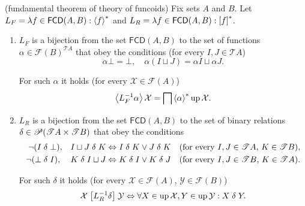 \begin{thm}
\label{fcd-as-cont}(fundamental theorem of theory of funcoids) Fix sets $A$ and $B$. Let $L_{F}=\lambda f\in\mathsf{FCD}(A,B):\left\langle f\right\rangle ^{\ast}$
and $L_{R}=\lambda f\in\mathsf{FCD}(A,B):\mathord{\mathrel{\left[f\right]^{\ast}}}$.
\begin{enumerate}
\item \label{main-f}$L_{F}$ is a bijection from the set $\mathsf{FCD}(A,B)$
to the set of functions $\alpha\in\mathscr{F}(B)^{\mathscr{T}A}$
that obey the conditions (for every $I,J\in\mathscr{T}A$)
\begin{equation}
\alpha\bot=\bot,\quad\alpha(I\sqcup J)=\alpha
I\sqcup\alpha J.\label{fchar-alph}
\end{equation}



For such $\alpha$ it holds (for every $\mathcal{X}\in\mathscr{F}(A)$)
\begin{equation}
\left\langle L_{F}^{-1}\alpha\right\rangle\mathcal{X}=\bigsqcap\left\langle \alpha\right\rangle ^{\ast}\operatorname{up}\mathcal{X}
.\label{fchar-alph-c}
\end{equation}


\item \label{main-r}$L_{R}$ is a bijection from the set $\mathsf{FCD}(A,B)$
to the set of binary relations
$\delta\in\mathscr{P}(\mathscr{T}A\times\mathscr{T}B)$
that obey the conditions
\begin{equation}
\begin{aligned}\lnot(I & \mathrel\delta\bot), & I\sqcup
J\mathrel\delta K & \Leftrightarrow I\mathrel\delta K\lor J\mathrel\delta K &
\text{(for every \ensuremath{I,J\in\mathscr{T}A},
\ensuremath{K\in\mathscr{T}B})},\\
\lnot(\bot & \mathrel\delta I), & K\mathrel\delta I\sqcup J &
\Leftrightarrow K\mathrel\delta I\lor K\mathrel\delta J & \text{(for every
\ensuremath{I,J\in\mathscr{T}B}, \ensuremath{K\in\mathscr{T}A})}.
\end{aligned}
\label{f-char-delt}
\end{equation}



For such $\delta$ it holds (for every $\mathcal{X}\in\mathscr{F}(A)$,
$\mathcal{Y}\in\mathscr{F}(B)$)
\begin{equation}
\mathcal{X}\mathrel{\left[L_{R}^{-1}\delta\right]}\mathcal{Y}\Leftrightarrow\forall
X\in\operatorname{up}\mathcal{X},Y\in\operatorname{up}\mathcal{Y}:X\mathrel\delta Y.\label{f-char-delt-c}
\end{equation}


\end{enumerate}
\end{thm}
